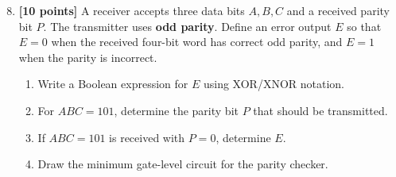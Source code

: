 \documentclass[11pt]{article}
\begin{document}
\begin{enumerate}
\setcounter{enumi}{7}

\item \textbf{[10 points]} A receiver accepts three data bits $A,B,C$ and a received parity bit $P$. The transmitter uses \textbf{odd parity}. Define an error output $E$ so that $E=0$ when the received four-bit word has correct odd parity, and $E=1$ when the parity is incorrect.

\begin{enumerate}[label=(\alph*)]
    \item Write a Boolean expression for $E$ using XOR/XNOR notation.
    \item For $ABC=101$, determine the parity bit $P$ that should be transmitted.
    \item If $ABC=101$ is received with $P=0$, determine $E$.
    \item Draw the minimum gate-level circuit for the parity checker.
\end{enumerate}
\end{enumerate}
\end{document}
